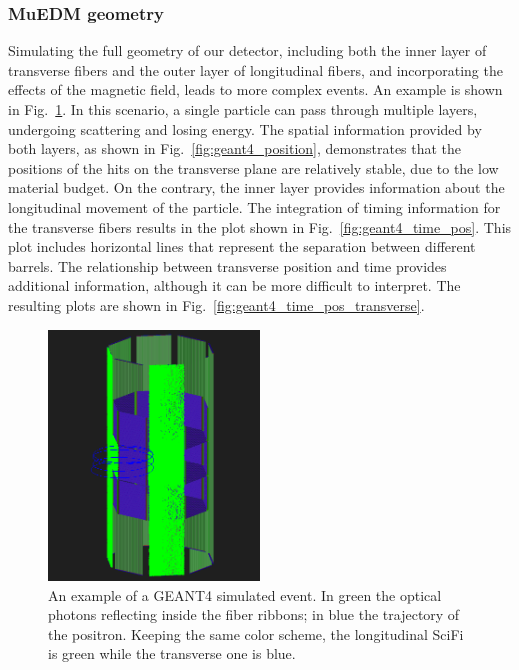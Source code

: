 \begin{refsection}
        \subsubsection{MuEDM geometry}
        Simulating the full geometry of our detector, including both the inner layer of transverse fibers and the outer layer of longitudinal fibers, and incorporating the effects of the magnetic field, leads to more complex events. 
        An example is shown in Fig.~\ref{fig:geant4_B}. In this scenario, a single particle can pass through multiple layers, undergoing scattering and losing energy. 
        The spatial information provided by both layers, as shown in Fig.~\ref{fig:geant4_position}, demonstrates that the positions of the hits on the transverse plane are relatively stable, due to the low material budget. On the contrary, the inner layer provides information about the longitudinal movement of the particle.
        The integration of timing information for the transverse fibers results in the plot shown in Fig.~\ref{fig:geant4_time_pos}. This plot includes horizontal lines that represent the separation between different barrels. 
        The relationship between transverse position and time provides additional information, although it can be more difficult to interpret. 
        The resulting plots are shown in Fig.~\ref{fig:geant4_time_pos_transverse}.

        \begin{figure}
            \centering
            \includegraphics[width=0.5\textwidth]{Figures/muEDM/Tracker/muedm_scifi_B.png}
            \caption{An example of a \textsc{GEANT4} simulated event. In green the optical photons reflecting inside the fiber ribbons; in blue the trajectory of the positron. Keeping the same color scheme, the longitudinal SciFi is green while the transverse one is blue.}
        \label{fig:geant4_B}
        \end{figure}


\end{refsection}
